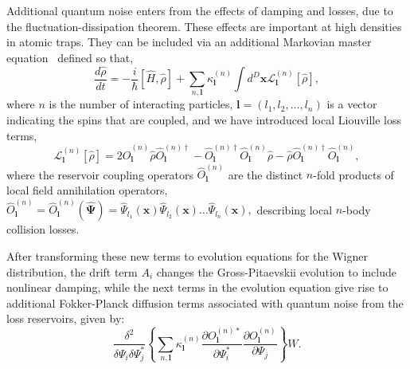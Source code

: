 \documentclass[aps,prl,twocolumn,showpacs,amsmath,amssymb,superscriptaddress,flushbottom,noraggedfooter]{revtex4-1}
\newcommand{\xvec}{\boldsymbol{x}}
\newcommand{\lvec}{\boldsymbol{l}}
\newcommand{\Psivec}{\boldsymbol{\Psi}}
\begin{document}
Additional quantum noise enters from the effects of damping and losses,
due to the fluctuation-dissipation theorem.
These effects are important at high densities in atomic traps.
They can be included via an additional Markovian master equation~\cite{Jack2002}
defined so that,
\begin{equation}
	\frac{d\hat{\rho}}{dt} =
		- \frac{i}{\hbar} \left[ \hat{H}, \hat{\rho} \right]
		+ \sum_{n,\lvec} \kappa_{\lvec}^{(n)} \int d^{D}\xvec
			\mathcal{L}_{\lvec}^{(n)} \left[ \hat{\rho} \right],
\end{equation}
where $n$ is the number of interacting particles,
$\lvec = (l_1, l_2, \ldots, l_n)$ is a vector indicating the spins that are coupled,
and we have introduced local Liouville loss terms,
\begin{equation}
	\mathcal{L}_{\lvec}^{(n)} \left[ \hat{\rho} \right] =
		2\hat{O}_{\lvec}^{(n)} \hat{\rho} \hat{O}_{\lvec}^{(n)\dagger}
		- \hat{O}_{\lvec}^{(n)\dagger} \hat{O}_{\lvec}^{(n)} \hat{\rho}
		- \hat{\rho} \hat{O}_{\lvec}^{(n)\dagger} \hat{O}_{\lvec}^{(n)},
\end{equation}
where the reservoir coupling operators $\hat{O}_{\lvec}^{(n)}$ are the distinct $n$-fold products of local field annihilation operators,
$\hat{O}_{\lvec}^{(n)} = \hat{O}_{\lvec}^{(n)} (\widehat{\Psivec}) =
	\widehat{\Psi}_{l_{1}} (\xvec)
	\widehat{\Psi}_{l_{2}} (\xvec) \ldots
	\widehat{\Psi}_{l_{n}} (\xvec),$
describing local $n$-body collision losses.

After transforming these new terms to evolution equations for the Wigner distribution, the drift term $A_{i}$
changes the Gross-Pitaevskii evolution to include nonlinear damping, while
the next terms in the evolution equation give rise to additional Fokker-Planck
diffusion terms associated with quantum noise from the loss reservoirs,
given by:
\begin{equation}
	\frac{\delta^{2}}{\delta\Psi_{i}\delta\Psi_{j}^{*}} \left\{
		\sum_{n,\lvec} \kappa_{\lvec}^{(n)}
			\frac{\partial O_{\lvec}^{(n)*}}{\partial\Psi_{i}^{*}}
			\frac{\partial O_{\lvec}^{(n)}}{\partial\Psi_{j}}
		\right\} W.
\end{equation}
\end{document}
